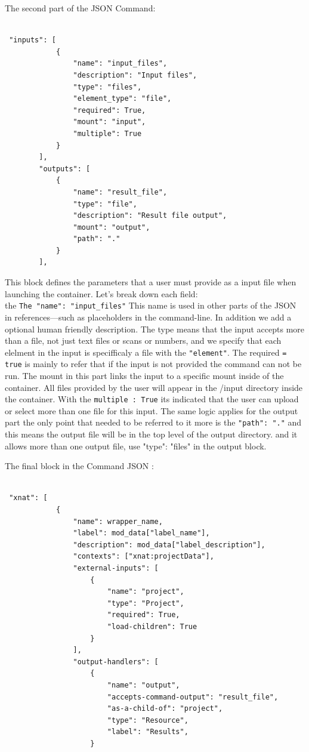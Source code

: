 The second part of the JSON Command:


\begin{lstlisting}

 "inputs": [
            {
                "name": "input_files",
                "description": "Input files",
                "type": "files",
                "element_type": "file",
                "required": True,
                "mount": "input",
                "multiple": True
            }
        ],
        "outputs": [
            {
                "name": "result_file",
                "type": "file",
                "description": "Result file output",
                "mount": "output",
                "path": "."
            }
        ],
\end{lstlisting}


This block defines the parameters that a user must provide as a input file when launching the container. 
Let's break down each field:\\

the \texttt{The "name": "input\_files"}  This name is used in other parts of the JSON in references—such as placeholders in the command-line. In addition we add a optional human friendly description. The type means that the input accepts more than a file, not just text files or scans or numbers, and we specify that each elelment in the input is specifficaly a file with  the \texttt{"element"}.
The required \texttt{= true} is mainly to refer that if the input is not provided the command can not be run. The mount in this part links the input to a specific mount inside of the container. All files provided by the user will appear in the /input directory inside the container. With the \texttt{multiple : True} its indicated that the user can upload or select more than one file for this input.
The same logic applies for the output part the only point that needed to be referred to it more is the \texttt{"path": "."} and this means the output file will be in the top level of the \/output directory. and it allows more than one output file, use "type": "files" in the output block.

The final block in the Command JSON :

\begin{lstlisting}

 "xnat": [
            {
                "name": wrapper_name,
                "label": mod_data["label_name"],
                "description": mod_data["label_description"],
                "contexts": ["xnat:projectData"],  
                "external-inputs": [
                    { 
                        "name": "project",
                        "type": "Project",
                        "required": True,
                        "load-children": True
                    }
                ],
                "output-handlers": [
                    {
                        "name": "output",
                        "accepts-command-output": "result_file",
                        "as-a-child-of": "project",
                        "type": "Resource",
                        "label": "Results",
                    }
\end{lstlisting}

